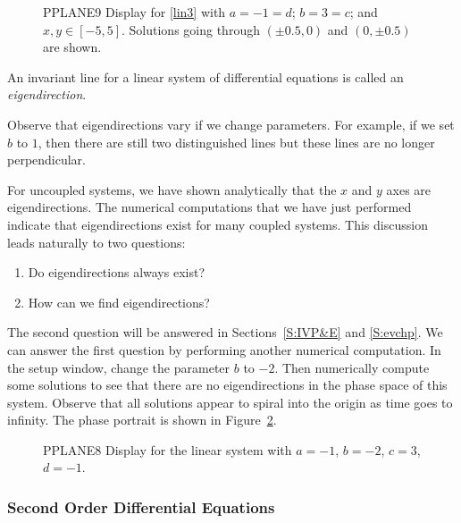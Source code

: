 \documentclass{ximera}
\begin{document}
\begin{figure}[htb]
     \centerline{%
     }
     \caption{{\sf PPLANE9 Display} for \protect\eqref{lin3} with
             $a=-1=d$; $b=3=c$; and $x,y\in [-5,5]$.
	Solutions going through $(\pm 0.5,0)$ and $(0,\pm 0.5)$ are shown.}
     \label{F:invariantlines}
\end{figure}

\begin{definition} \label{D:eigendirection}
An invariant line for a linear system of differential equations
is called an {\em eigendirection}.
\end{definition}

Observe that eigendirections vary if we change parameters.  For
example, if we set $b$ to $1$, then there are still two
distinguished lines but these lines are no longer perpendicular.

For uncoupled systems, we have shown analytically that the $x$
and $y$ axes are eigendirections.  The numerical computations
that we have just performed indicate that eigendirections exist
for many coupled systems.  This discussion leads naturally to
two questions:
\begin{enumerate}
\item Do eigendirections always exist?
\item How can we find eigendirections?
\end{enumerate}
The second question will be answered in Sections~\ref{S:IVP&E} and 
\ref{S:evchp}.  We can answer the first question by performing another 
numerical computation.  In the setup window, change the parameter $b$ 
to $-2$.  Then numerically compute some solutions to see that there
are no eigendirections in the phase space of this system.  Observe that
all solutions appear to spiral into the origin as time goes to
infinity.  The phase portrait is shown in Figure~\ref{pp_dsp2}.
\begin{figure}[htb]
      \centerline{%
      }
      \caption{{\sf PPLANE8 Display} for the {\sf linear system}
		with $a=-1$, $b=-2$, $c=3$, $d=-1$.}
      \label{pp_dsp2}
\end{figure}

\subsubsection*{Second Order Differential Equations}
\end{document}
